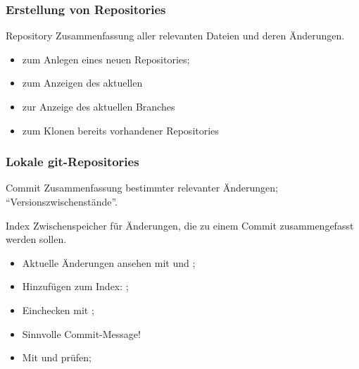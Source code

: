 \documentclass{cms-kurs}
\begin{document}
\begin{frame}
  \frametitle{Erstellung von Repositories}

  \onslide<+->

  \begin{block}{Repository}
    Zusammenfassung aller relevanten Dateien und deren Änderungen.
  \end{block}

  \onslide<+->

  \begin{itemize}
  \item {} zum Anlegen eines neuen Repositories;
  \item {} zum Anzeigen des aktuellen
  \item {} zur Anzeige des aktuellen Branches
  \item {} zum Klonen bereits vorhandener Repositories
  \end{itemize}

\end{frame}

\begin{frame}
  \frametitle{Lokale git-Repositories}

  \onslide<+->

  \begin{block}{Commit}
    Zusammenfassung bestimmter relevanter Änderungen;
    \enquote{Versionszwischenstände}.
  \end{block}

  \begin{block}{Index}
    Zwischenspeicher für Änderungen, die zu einem Commit zusammengefasst werden
    sollen.
  \end{block}

  \onslide<+->

  \begin{itemize}
  \item Aktuelle Änderungen ansehen mit  und ;
  \item Hinzufügen zum Index: ;
  \item Einchecken mit ;
  \item Sinnvolle Commit-Message!
  \item Mit  und  prüfen;
  \end{itemize}

\end{frame}
\end{document}
